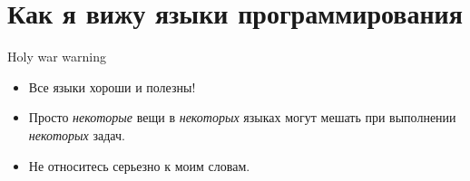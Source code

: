 

\section{Как я вижу языки программирования}
\showTOC

\begin{frame}[t]{Holy war warning}

\begin{itemize}

\item Все языки хороши и полезны!

\pause
\item Просто \textit{некоторые} вещи в \textit{некоторых} языках могут мешать при выполнении \textit{некоторых} задач.

\pause
\item Не относитесь серьезно к моим словам.

\end{itemize}

\end{frame}


